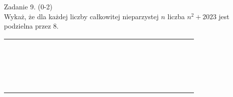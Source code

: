 \documentclass[10pt]{article}
\begin{document}
Zadanie 9. (0-2)\\
Wykaż, że dla każdej liczby całkowitej nieparzystej \(n\) liczba \(n^{2}+2023\) jest podzielna przez 8.

\begin{center}
\begin{tabular}{|c|c|c|c|c|c|c|c|c|c|c|c|c|c|c|c|c|c|c|c|c|c|c|c|}
\hline
 &  &  &  &  &  &  &  &  &  &  &  &  &  &  &  &  &  &  &  &  &  &  &  \\
\hline
 &  &  &  &  &  &  &  &  &  &  &  &  &  &  &  &  &  &  &  &  &  &  &  \\
\hline
 &  &  &  &  &  &  &  &  &  &  &  &  &  &  &  &  &  &  &  &  &  &  &  \\
\hline
 &  &  &  &  &  &  &  &  &  &  &  &  &  &  &  &  &  &  &  &  &  &  &  \\
\hline
 &  &  &  &  &  &  &  &  &  &  &  &  &  &  &  &  &  &  &  &  &  &  &  \\
\hline
 &  &  &  &  &  &  &  &  &  &  &  &  &  &  &  &  &  &  &  &  &  &  &  \\
\hline
 &  &  &  &  &  &  &  &  &  &  &  &  &  &  &  &  &  &  &  &  &  &  &  \\
\hline
 &  &  &  &  &  &  &  &  &  &  &  &  &  &  &  &  &  &  &  &  &  &  &  \\
\hline
 &  &  &  &  &  &  &  &  &  &  &  &  &  &  &  &  &  &  &  &  &  &  &  \\
\hline
 &  &  &  &  &  &  &  &  &  &  &  &  &  &  &  &  &  &  &  &  &  &  &  \\
\hline
 &  &  &  &  &  &  &  &  &  &  &  &  &  &  &  &  &  &  &  &  &  &  &  \\
\hline
 &  &  &  &  &  &  &  &  &  &  &  &  &  &  &  &  &  &  &  &  &  &  &  \\
\hline
 &  &  &  &  &  &  &  &  &  &  &  &  &  &  &  &  &  &  &  &  &  &  &  \\
\hline
 &  &  &  &  &  &  &  &  &  &  &  &  &  &  &  &  &  &  &  &  &  &  &  \\
\hline
 &  &  &  &  &  &  &  &  &  &  &  &  &  &  &  &  &  &  &  &  &  &  &  \\
\hline
 &  &  &  &  &  &  &  &  &  &  &  &  &  &  &  &  &  &  &  &  &  &  &  \\
\hline
 &  &  &  &  &  &  &  &  &  &  &  &  &  &  &  &  &  &  &  &  &  &  &  \\
\hline
 &  &  &  &  &  &  &  &  &  &  &  &  &  &  &  &  &  &  &  &  &  &  &  \\
\hline
 &  &  &  &  &  &  &  &  &  &  &  &  &  &  &  &  &  &  &  &  &  &  &  \\

\end{tabular}
\end{center}
\end{document}
